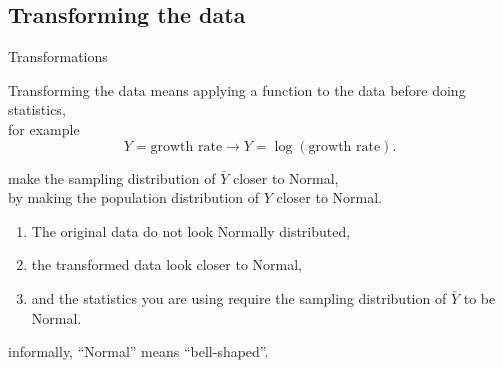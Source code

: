 \subsection{Transforming the data}

\begin{frame}{Transformations}

    \begin{block}{Transforming the data}
        means applying a function to the data before doing statistics,\\
        for example
        \[  Y = \text{growth rate} \longrightarrow Y = \log( \text{growth rate} ). \]
    \end{block}

    \vspace{2em}

     make the sampling distribution of $\bar Y$ closer to Normal,\\
    by making the population distribution of $Y$ closer to Normal.

    \vspace{2em}

    \begin{enumerate}
        \item The original data do not look Normally distributed,
        \item the transformed data look closer to Normal,
        \item and the statistics you are using require the sampling distribution of $\bar Y$ to be Normal.
    \end{enumerate}

    \vspace{2em}

     informally, ``Normal'' means ``bell-shaped''.

\end{frame}

